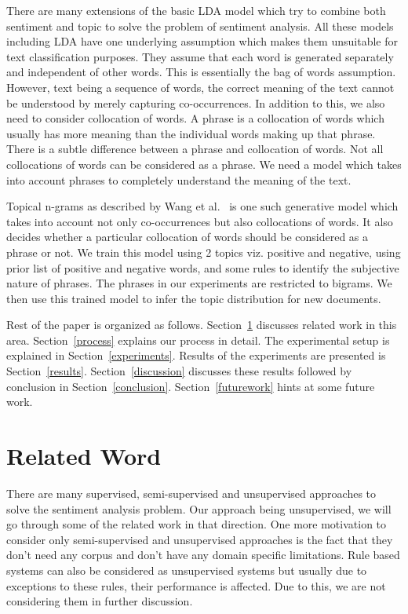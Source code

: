 \documentclass[11pt]{article}
\begin{document}
There are many extensions of the basic LDA model which try to combine both sentiment 
and topic to solve the problem of sentiment analysis. All these models including LDA 
have one underlying assumption which makes them unsuitable for text classification
purposes. They assume that each word is generated separately and independent of other 
words. This is essentially the bag of words assumption. However, text being a sequence 
of words, the correct meaning of the text cannot be understood by merely capturing
co-occurrences. In addition to this, we also need to consider collocation of words.
A phrase is a collocation of words which usually has more meaning than the individual
words making up that phrase. There is a subtle difference between a phrase and collocation
of words. Not all collocations of words can be considered as a phrase. We need a 
model which takes into account phrases to completely understand the meaning of the text.

Topical n-grams as described by Wang et al.~ is one such generative 
model which takes into account not only co-occurrences but also collocations of words. It 
also decides whether a particular collocation of words should be considered as a phrase or not. 
We train this model using 2 topics viz. positive and negative, using prior list of positive 
and negative words, and some rules to identify the subjective nature of phrases. The phrases
in our experiments are restricted to bigrams. We then use this trained model to infer the topic
distribution for new documents.

Rest of the paper is organized as follows. Section~\ref{survey} discusses related work
in this area. Section~\ref{process} explains our process in detail. The experimental 
setup is explained in Section~\ref{experiments}. Results of the experiments are presented
is Section~\ref{results}. Section~\ref{discussion} discusses these results followed by
conclusion in Section~\ref{conclusion}. Section~\ref{futurework} hints at some future work.


\section{Related Word}\label{survey}

There are many supervised, semi-supervised and unsupervised approaches to solve the 
sentiment analysis problem. Our approach being unsupervised, we will go through some of
the related work in that direction. One more motivation to consider only semi-supervised and
unsupervised approaches is the fact that they don't need any corpus and don't have any domain 
specific limitations. Rule based systems can also be considered as unsupervised systems but 
usually due to exceptions to these rules, their performance is affected. Due to this, we
are not considering them in further discussion.
\end{document}
